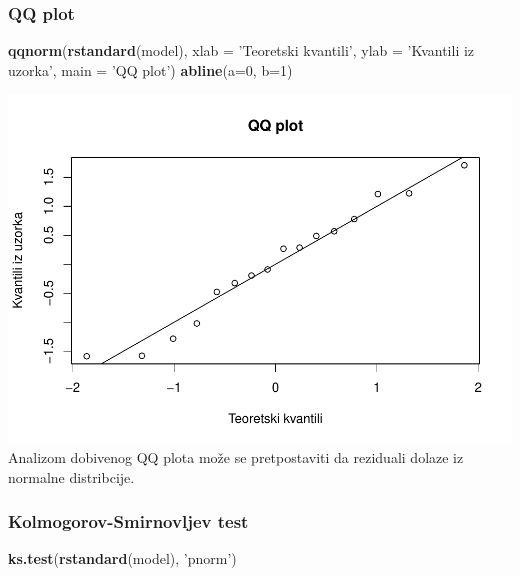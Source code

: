 \documentclass[]{article}
\newenvironment{Shaded}{\begin{snugshade}}{\end{snugshade}}
\newcommand{\KeywordTok}[1]{\textcolor[rgb]{0.13,0.29,0.53}{\textbf{{#1}}}}
\newcommand{\DataTypeTok}[1]{\textcolor[rgb]{0.13,0.29,0.53}{{#1}}}
\newcommand{\DecValTok}[1]{\textcolor[rgb]{0.00,0.00,0.81}{{#1}}}
\newcommand{\StringTok}[1]{\textcolor[rgb]{0.31,0.60,0.02}{{#1}}}
\newcommand{\NormalTok}[1]{{#1}}
\begin{document}
\subsubsection{QQ plot}\label{qq-plot-2}

\begin{Shaded}
\begin{Highlighting}[]
\KeywordTok{qqnorm}\NormalTok{(}\KeywordTok{rstandard}\NormalTok{(model), }\DataTypeTok{xlab =} \StringTok{'Teoretski kvantili'}\NormalTok{, }\DataTypeTok{ylab =} \StringTok{'Kvantili iz uzorka'}\NormalTok{,}
       \DataTypeTok{main =} \StringTok{'QQ plot'}\NormalTok{)}
\KeywordTok{abline}\NormalTok{(}\DataTypeTok{a=}\DecValTok{0}\NormalTok{, }\DataTypeTok{b=}\DecValTok{1}\NormalTok{)}
\end{Highlighting}
\end{Shaded}

\includegraphics{Izvjestaj_files/figure-latex/unnamed-chunk-20-1.pdf}
Analizom dobivenog QQ plota može se pretpostaviti da reziduali dolaze iz
normalne distribcije.

\subsubsection{Kolmogorov-Smirnovljev
test}\label{kolmogorov-smirnovljev-test-2}

\begin{Shaded}
\begin{Highlighting}[]
\KeywordTok{ks.test}\NormalTok{(}\KeywordTok{rstandard}\NormalTok{(model), }\StringTok{'pnorm'}\NormalTok{)}
\end{Highlighting}
\end{Shaded}
\end{document}

